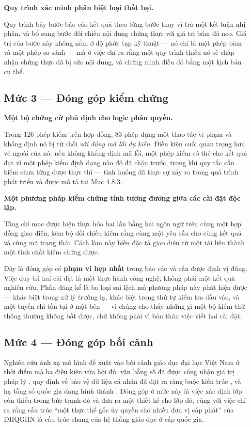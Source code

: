 \noindent \textbf{Quy trình xác minh phân biệt loại thất bại.}

Quy trình bảy bước báo cáo kết quả theo từng bước thay vì trả một kết luận nhị phân, và bổ sung bước đối chiếu nội dung chứng thực với giá trị băm đã neo. Giá trị của bước này không nằm ở độ phức tạp kỹ thuật --- nó chỉ là một phép băm và một phép so sánh --- mà ở việc chỉ ra rằng một quy trình thiếu nó sẽ chấp nhận chứng thực đã bị sửa nội dung, và chứng minh điều đó bằng một kịch bản cụ thể.

\subsection{Mức 3 --- Đóng góp kiểm chứng}

\noindent \textbf{Một bộ chứng cứ phủ định cho logic phân quyền.}

Trong 126 phép kiểm trên hợp đồng, 83 phép dựng một thao tác vi phạm và khẳng định nó bị từ chối \emph{với đúng mã lỗi dự kiến}. Điều kiện cuối quan trọng hơn vẻ ngoài của nó: nếu không khẳng định mã lỗi, một phép kiểm có thể cho kết quả đạt vì một phép kiểm định dạng nào đó đã chặn trước, trong khi quy tắc cần kiểm chưa từng được thực thi --- tình huống đã thực sự xảy ra trong quá trình phát triển và được mô tả tại Mục 4.8.3.

\noindent \textbf{Một phương pháp kiểm chứng tính tương đương giữa các cài đặt độc lập.}

Tầng chỉ mục được hiện thực hóa hai lần bằng hai ngôn ngữ trên cùng một hợp đồng giao diện, kèm bộ đối chiếu kiểm rằng cùng một yêu cầu cho cùng kết quả và cùng mã trạng thái. Cách làm này biến đặc tả giao diện từ một tài liệu thành một tính chất kiểm chứng được.

Đây là đóng góp có \textbf{phạm vi hẹp nhất} trong báo cáo và cần được định vị đúng. Việc duy trì hai cài đặt là một thực hành công nghệ, không phải một kết quả nghiên cứu. Phần đáng kể là ba loại sai lệch mà phương pháp này phát hiện được --- khác biệt trong xử lý trường lạ, khác biệt trong thứ tự kiểm tra đầu vào, và một tuyến chỉ tồn tại ở một bên --- vì chúng cho thấy những gì một bộ kiểm thử thông thường không bắt được, chứ không phải vì bản thân việc viết hai cài đặt.

\subsection{Mức 4 --- Đóng góp bối cảnh}

Nghiên cứu ánh xạ mô hình đề xuất vào bối cảnh giáo dục đại học Việt Nam ở thời điểm mà ba điều kiện vừa hội đủ: văn bằng số đã được công nhận giá trị pháp lý \cite{TT10_2026}, quy định về bảo vệ dữ liệu cá nhân đã đặt ra ràng buộc kiến trúc \cite{LuatBVDLCN2025}, và hạ tầng số quốc gia đang hình thành \cite{NDAChain2025}. Đóng góp ở mức này là việc xác định lớp còn thiếu trong bức tranh đó và đưa ra một thiết kế cho lớp đó, cùng với việc chỉ ra rằng cấu trúc {``}một thực thể gốc ủy quyền cho nhiều đơn vị cấp phát{''} của ĐHQGHN là cấu trúc chung của hệ thống giáo dục ở cấp quốc gia.

